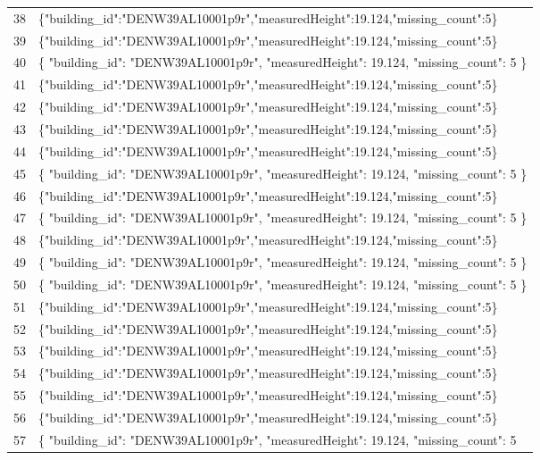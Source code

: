 \documentclass[a4paper,11pt]{article}
\begin{document}
\begin{table}[ht]
\begin{tabular}{r p{12cm}}
38 & \{"building\_id":"DENW39AL10001p9r","measuredHeight":19.124,"missing\_count":5\} \\
39 & \{"building\_id":"DENW39AL10001p9r","measuredHeight":19.124,"missing\_count":5\} \\
40 & \{
  "building\_id": "DENW39AL10001p9r",
  "measuredHeight": 19.124,
  "missing\_count": 5
\} \\
41 & \{"building\_id":"DENW39AL10001p9r","measuredHeight":19.124,"missing\_count":5\} \\
42 & \{"building\_id":"DENW39AL10001p9r","measuredHeight":19.124,"missing\_count":5\} \\
43 & \{"building\_id":"DENW39AL10001p9r","measuredHeight":19.124,"missing\_count":5\} \\
44 & \{"building\_id":"DENW39AL10001p9r","measuredHeight":19.124,"missing\_count":5\} \\
45 & \{
  "building\_id": "DENW39AL10001p9r",
  "measuredHeight": 19.124,
  "missing\_count": 5
\} \\
46 & \{"building\_id":"DENW39AL10001p9r","measuredHeight":19.124,"missing\_count":5\} \\
47 & \{
  "building\_id": "DENW39AL10001p9r",
  "measuredHeight": 19.124,
  "missing\_count": 5
\} \\
48 & \{"building\_id":"DENW39AL10001p9r","measuredHeight":19.124,"missing\_count":5\} \\
49 & \{
  "building\_id": "DENW39AL10001p9r",
  "measuredHeight": 19.124,
  "missing\_count": 5
\} \\
50 & \{
  "building\_id": "DENW39AL10001p9r",
  "measuredHeight": 19.124,
  "missing\_count": 5
\} \\
51 & \{"building\_id":"DENW39AL10001p9r","measuredHeight":19.124,"missing\_count":5\} \\
52 & \{"building\_id":"DENW39AL10001p9r","measuredHeight":19.124,"missing\_count":5\} \\
53 & \{"building\_id":"DENW39AL10001p9r","measuredHeight":19.124,"missing\_count":5\} \\
54 & \{"building\_id":"DENW39AL10001p9r","measuredHeight":19.124,"missing\_count":5\} \\
55 & \{"building\_id":"DENW39AL10001p9r","measuredHeight":19.124,"missing\_count":5\} \\
56 & \{"building\_id":"DENW39AL10001p9r","measuredHeight":19.124,"missing\_count":5\} \\
57 & \{
  "building\_id": "DENW39AL10001p9r",
  "measuredHeight": 19.124,
  "missing\_count": 5

\end{tabular}
\end{table}
\end{document}
